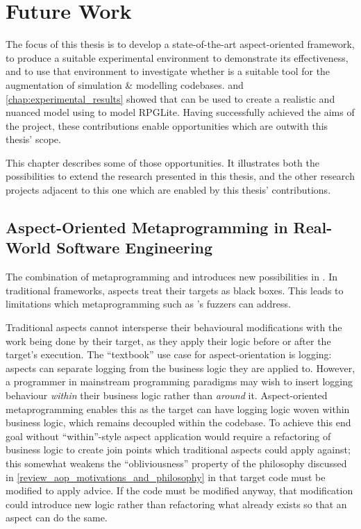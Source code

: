 \chapter{Future Work}\label{chap:future_work}

The focus of this thesis is to develop a state-of-the-art aspect-oriented
framework, to produce a suitable experimental environment to demonstrate its
effectiveness, and to use that environment to investigate whether
\aspectorientation{} is a suitable tool for the augmentation of simulation \&
modelling codebases.  and
\cref{chap:experimental_results} showed that \aspectorientation{} can be used to
create a realistic and nuanced model using \pdsf{} to model RPGLite. Having
successfully achieved the aims of the project, these contributions enable
opportunities which are outwith this thesis' scope.

This chapter describes some of those opportunities. It illustrates both the
possibilities to extend the research presented in this thesis, and the other
research projects adjacent to this one which are enabled by this thesis'
contributions.

\section{Aspect-Oriented Metaprogramming in Real-World Software Engineering}
\label{future_work_aspect_oriented_metaprogramming}

The combination of metaprogramming and \aspectorientation introduces new
possibilities in \aop{}. In traditional \aspectorientation frameworks, aspects
treat their targets as black boxes. This leads to limitations which
\aspectoriented{} metaprogramming such as \pdsf{}'s fuzzers can address.

Traditional aspects cannot intersperse their behavioural modifications with the
work being done by their target, as they apply their logic before or after the
target's execution. The ``textbook'' use case for aspect-orientation is logging:
aspects can separate logging from the business logic they are applied to.
However, a programmer in mainstream programming paradigms may wish to insert
logging behaviour \emph{within} their business logic rather than \emph{around}
it. Aspect-oriented metaprogramming enables this as the target can have logging
logic woven within business logic, which remains decoupled within the codebase.
To achieve this end goal without ``within''-style aspect application would
require a refactoring of business logic to create join points which traditional
aspects could apply against; this somewhat weakens the ``obliviousness'' property of the
\aspectoriented{} philosophy discussed in
\cref{review_aop_motivations_and_philosophy} in that target code must be modified
to apply advice. If the code must be modified anyway, that modification could
introduce new logic rather than refactoring what already exists so that an
aspect can do the same. 

